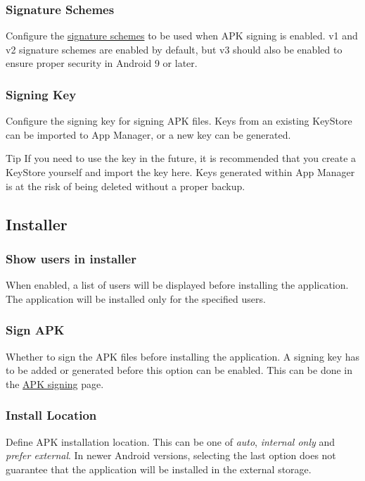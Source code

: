 \subsubsection{Signature Schemes} %
Configure the \href{https://source.android.com/security/apksigning}{signature schemes} to be used when APK signing is enabled.
v1 and v2 signature schemes are enabled by default, but v3 should also be enabled to ensure proper security in Android 9 or later.

\subsubsection{Signing Key} %
Configure the signing key for signing APK files. Keys from an existing KeyStore can be imported to App Manager,
or a new key can be generated.

\begin{tip}{Tip}
    If you need to use the key in the future, it is recommended that you create a KeyStore yourself and import the key
    here. Keys generated within App Manager is at the risk of being deleted without a proper backup.
\end{tip}

\subsection{Installer}\label{subsec:installer} %

\subsubsection{Show users in installer} %
When enabled, a list of users will be displayed before installing the application. The application will be installed
only for the specified users.

\subsubsection{Sign APK} %
Whether to sign the APK files before installing the application. A signing key has to be added or generated before this
option can be enabled. This can be done in the \hyperref[subsec:apk-signing]{APK signing} page.

\subsubsection{Install Location} %
Define APK installation location. This can be one of \textit{auto}, \textit{internal only} and \textit{prefer external}.
In newer Android versions, selecting the last option does not guarantee that the application will be installed in the
external storage.

